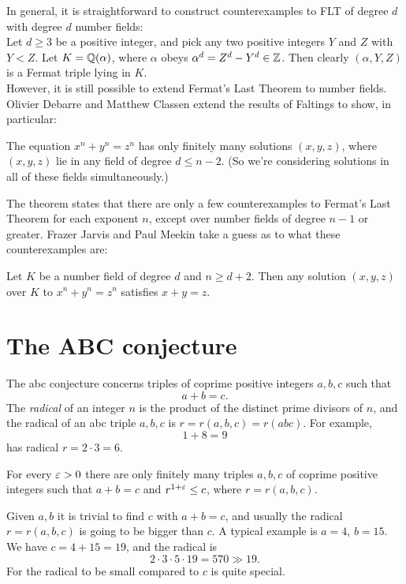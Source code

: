 \documentclass{book}
\begin{document}
In general, it is straightforward to construct counterexamples to FLT
of degree $d$ with degree $d$ number fields: \\
Let $d\ge 3$ be a positive integer, and pick any two positive integers
$Y$ and $Z$ with $Y<Z$. Let $K = \mathbb{Q}(\alpha)$, where $\alpha$ obeys
$\alpha^d = Z^d-Y^d \in \mathbb{Z}$. Then clearly $(\alpha,Y,Z)$ is a Fermat triple lying in $K$. \\

However, it is still possible to extend Fermat's Last Theorem to number fields. Olivier Debarre and Matthew Classen \cite{deb-cla} extend the results of Faltings to show, in particular:
\begin{theorem}\label{th:dc}
The equation $x^n+y^n=z^n$ has only finitely many solutions $(x,y,z)$,
where $(x,y,z)$ lie in any field of degree $d\leq n-2$.  (So we're
considering solutions in all of these fields simultaneously.)
\end{theorem}

The theorem states that there are only a few counterexamples to Fermat's Last Theorem for each exponent $n$, except over number fields of degree $n-1$ or greater. Frazer Jarvis and Paul Meekin \cite{jar} take a guess as to what these counterexamples are:
\begin{conjecture}\label{conj:jarv}
Let $K$ be a number field of degree $d$ and $n\geq d+2$. Then any solution $(x,y,z)$ over $K$ to $x^n+y^n=z^n$ satisfies $x+y=z$.
\end{conjecture}

\section{The ABC conjecture}
The abc conjecture
concerns triples of coprime positive integers $a,b,c$  such that
$$
a+b = c.
$$
The {\em radical} of an integer $n$ is the product
of the distinct prime divisors of $n$, and the radical
of an abc triple $a,b,c$ is $r=r(a,b,c)=r(abc)$.
For example,
$$
  1 + 8 = 9
$$
has radical $r=2\cdot 3=6$.

\begin{conjecture}\label{conj:abc}
For every $\varepsilon>0$ there are only finitely many
triples $a,b,c$ of coprime positive integers such
that $a+b=c$ and $r^{1+\varepsilon}\leq c$,
where $r=r(a,b,c)$.
\end{conjecture}

Given $a,b$ it is trivial to find $c$ with $a+b=c$, and
usually the radical $r=r(a,b,c)$ is going to be bigger
than $c$.   A typical example is $a=4$, $b=15$.
We have $c=4+15=19$, and the radical is
$$2\cdot 3\cdot5\cdot19=570 \gg 19.$$
For the radical to be small compared to $c$
is quite special.
\end{document}
